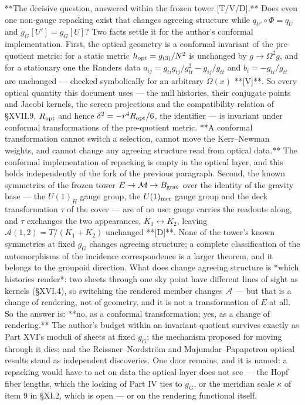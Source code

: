 **The decisive question, answered within the frozen tower [T/V/D].** Does even one non-gauge repacking exist that changes agreeing structure while $q_{U'}\circ\Phi = q_U$ and $g_G[U'] = g_G[U]$? Two facts settle it for the author's conformal implementation. First, the optical geometry is a conformal invariant of the pre-quotient metric: for a static metric $h_{\rm opt} = g_{(3)}/N^2$ is unchanged by $g\to\Omega^2g$, and for a stationary one the Randers data $a_{ij} = g_{ti}g_{tj}/g_{tt}^2-g_{ij}/g_{tt}$ and $b_i = -g_{ti}/g_{tt}$ are unchanged — checked symbolically for an arbitrary $\Omega(x)$ **[V]**. So every optical quantity this document uses — the null histories, their conjugate points and Jacobi kernels, the screen projections and the compatibility relation of §XVII.9, $R_{\rm opt}$ and hence $\delta^2 = -r^4R_{\rm opt}/6$, the identifier — is invariant under conformal transformations of the pre-quotient metric. **A conformal transformation cannot switch a selection, cannot move the Kerr–Newman weights, and cannot change any agreeing structure read from optical data.** The conformal implementation of repacking is empty in the optical layer, and this holds independently of the fork of the previous paragraph. Second, the known symmetries of the frozen tower $E\to\mathcal M\to B_{\rm grav}$ over the identity of the gravity base — the $U(1)_H$ gauge group, the $U(1)_{\rm mer}$ gauge group and the deck transformation $\tau$ of the cover — are of no use: gauge carries the readouts along, and $\tau$ exchanges the two appearances, $K_1\leftrightarrow K_2$, leaving $\mathcal A(1,2) = T/(K_1+K_2)$ unchanged **[D]**. None of the tower's known symmetries at fixed $g_G$ changes agreeing structure; a complete classification of the automorphisms of the incidence correspondence is a larger theorem, and it belongs to the groupoid direction. What does change agreeing structure is *which histories render*: two sheets through one sky point have different lines of sight as kernels (§XVI.4), so switching the rendered member changes $\mathcal A$ — but that is a change of rendering, not of geometry, and it is not a transformation of $E$ at all. So the answer is: **no, as a conformal transformation; yes, as a change of rendering.** The author's budget within an invariant quotient survives exactly as Part XVI's moduli of sheets at fixed $g_G$; the mechanism proposed for moving through it dies; and the Reissner–Nordström and Majumdar–Papapetrou optical results stand as independent discoveries. One door remains, and it is named: a repacking would have to act on data the optical layer does not see — the Hopf fiber lengths, which the locking of Part IV ties to $g_G$, or the meridian scale $\kappa$ of item 9 in §XI.2, which is open — or on the rendering functional itself.

